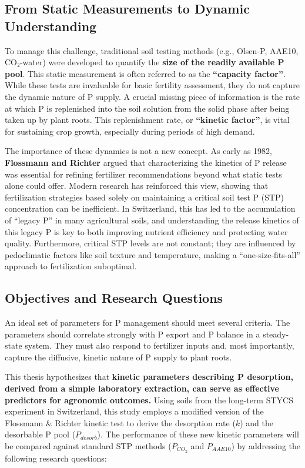 \documentclass[
  a4paper,
]{article}
\begin{document}
\subsection{From Static Measurements to Dynamic
Understanding}\label{from-static-measurements-to-dynamic-understanding}

To manage this challenge, traditional soil testing methods (e.g.,
Olsen-P, AAE10, CO₂-water) were developed to quantify the \textbf{size
of the readily available P pool}. This static measurement is often
referred to as the \textbf{``capacity factor''}. While these tests are
invaluable for basic fertility assessment, they do not capture the
dynamic nature of P supply. A crucial missing piece of information is
the rate at which P is replenished into the soil solution from the solid
phase after being taken up by plant roots. This replenishment rate, or
\textbf{``kinetic factor''}, is vital for sustaining crop growth,
especially during periods of high demand.

The importance of these dynamics is not a new concept. As early as 1982,
\textbf{Flossmann and Richter} argued that characterizing the kinetics
of P release was essential for refining fertilizer recommendations
beyond what static tests alone could offer. Modern research has
reinforced this view, showing that fertilization strategies based solely
on maintaining a critical soil test P (STP) concentration can be
inefficient. In Switzerland, this has led to the accumulation of
``legacy P'' in many agricultural soils, and understanding the release
kinetics of this legacy P is key to both improving nutrient efficiency
and protecting water quality. Furthermore, critical STP levels are not
constant; they are influenced by pedoclimatic factors like soil texture
and temperature, making a ``one-size-fits-all'' approach to
fertilization suboptimal.

\subsection{Objectives and Research
Questions}\label{objectives-and-research-questions}

An ideal set of parameters for P management should meet several
criteria. The parameters should correlate strongly with P export and P
balance in a steady-state system. They must also respond to fertilizer
inputs and, most importantly, capture the diffusive, kinetic nature of P
supply to plant roots.

This thesis hypothesizes that \textbf{kinetic parameters describing P
desorption, derived from a simple laboratory extraction, can serve as
effective predictors for agronomic outcomes.} Using soils from the
long-term STYCS experiment in Switzerland, this study employs a modified
version of the Flossmann \& Richter kinetic test to derive the
desorption rate (\(k\)) and the desorbable P pool (\(P_{desorb}\)). The
performance of these new kinetic parameters will be compared against
standard STP methods (\(P_{CO_2}\) and \(P_{AAE10}\)) by addressing the
following research questions:
\end{document}
